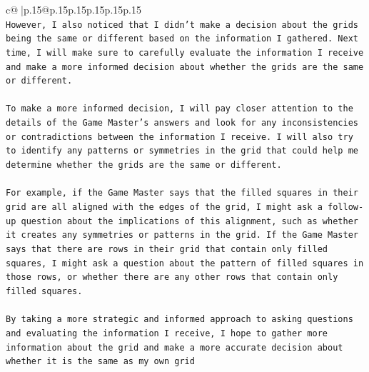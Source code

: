 \documentclass{article}
\begin{document}
{\begin{supertabular}{c@{$\;$}|p{.15\linewidth}@{}p{.15\linewidth}p{.15\linewidth}p{.15\linewidth}p{.15\linewidth}p{.15\linewidth}}
{{{\\ 
\texttt{However, I also noticed that I didn't make a decision about the grids being the same or different based on the information I gathered. Next time, I will make sure to carefully evaluate the information I receive and make a more informed decision about whether the grids are the same or different.} \\
\\ 
\texttt{To make a more informed decision, I will pay closer attention to the details of the Game Master's answers and look for any inconsistencies or contradictions between the information I receive. I will also try to identify any patterns or symmetries in the grid that could help me determine whether the grids are the same or different.} \\
\\ 
\texttt{For example, if the Game Master says that the filled squares in their grid are all aligned with the edges of the grid, I might ask a follow{-}up question about the implications of this alignment, such as whether it creates any symmetries or patterns in the grid. If the Game Master says that there are rows in their grid that contain only filled squares, I might ask a question about the pattern of filled squares in those rows, or whether there are any other rows that contain only filled squares.} \\
\\ 
\texttt{By taking a more strategic and informed approach to asking questions and evaluating the information I receive, I hope to gather more information about the grid and make a more accurate decision about whether it is the same as my own grid} \\
            }
        }
    }
     \\ \\

\end{supertabular}
}
\end{document}

